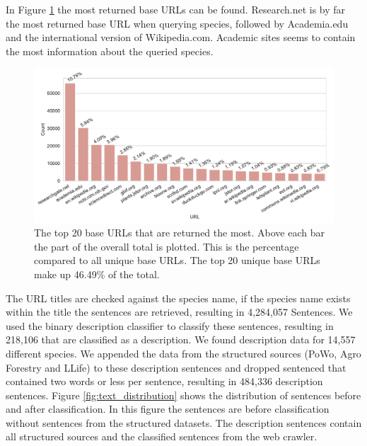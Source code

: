 \documentclass[a4paper, 12pt, oneside]{book} %
\begin{document}
In Figure \ref{fig:URL_top20} the most returned base URLs can be found.
Research.net is by far the most returned base URL when querying species, followed by Academia.edu and the international version of Wikipedia.com.
Academic sites seems to contain the most information about the queried species.
\begin{figure}[h!]
 \centering
 \includegraphics[width=\textwidth]{figures/URL_top20.pdf}
 \caption[The top 20 returned base URLs]{The top 20 base URLs that are returned the most. Above each bar the part of the overall total is plotted. This is the percentage compared to all unique base URLs. The top 20 unique base URLs make up 46.49\% of the total.}
 \label{fig:URL_top20}
\end{figure}
The URL titles are checked against the species name, if the species name exists within the title the sentences are retrieved, resulting in 4,284,057 Sentences.
We used the binary description classifier to classify these sentences, resulting in 218,106 that are classified as a description.
We found description data for 14,557 different species.
We appended the data from the structured sources (PoWo, Agro Forestry and LLife) to these description sentences and dropped sentenced that contained two words or less per sentence, resulting in 484,336 description sentences.
Figure \ref{fig:text_distribution} shows the distribution of sentences before and after classification.
In this figure the sentences are before classification without sentences from the structured datasets.
The description sentences contain all structured sources and the classified sentences from the web crawler.
\end{document}
